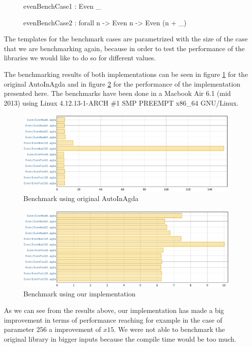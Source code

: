 \documentclass[a4paper]{article}
\begin{document}
\begin{figure}[h]
  \begin{code}
    evenBenchCase1 : Even _

    evenBenchCase2 : forall {n} -> Even n -> Even (n + _)
  \end{code}
\end{figure}

The templates for the benchmark cases are parametrized with the size of the case
that we are benchmarking again, because in order to test the performance of the 
libraries we would like to do so for different values.

The benchmarking results of both implementations can be seen in figure
\ref{fig:vanilla} for the original AutoInAgda and in figure \ref{fig:our} for
the performance of the implementation presented here. The benchmarks have been
done in a Macbook Air 6.1 (mid 2013) using Linux 4.12.13-1-ARCH \#1 SMP PREEMPT
x86\_64 GNU/Linux.

\begin{figure}[h]
  \includegraphics[scale=0.6]{benchmark-vanilla}
  \caption{Benchmark using original AutoInAgda}
  \label{fig:vanilla}
\end{figure}

\begin{figure}[h]
  \includegraphics[scale=0.6]{benchmark}
  \caption{Benchmark using our implementation}
  \label{fig:our}
\end{figure}

As we can see from the results above, our implementation has made a big
improvement in terms of performance reaching for example in the case of
parameter 256 a improvement of $x15$. We were not able to benchmark the original
library in bigger inputs because the compile time would be too much.
\end{document}

